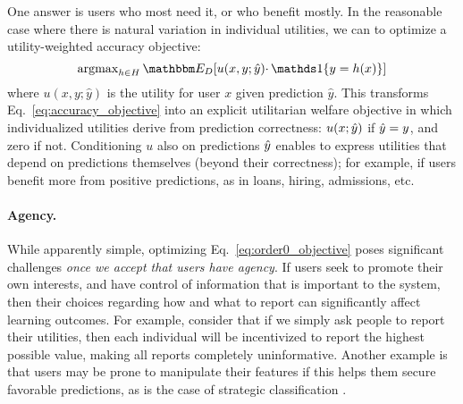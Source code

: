 One answer is users who most need it, or who benefit mostly.
In the reasonable case where there is natural variation in individual utilities,
we can to optimize a utility-weighted accuracy objective:
\begin{equation}
\label{eq:order0_objective}
\argmax\nolimits_{h \in H} \expect{\dist}{u(x,y; \hat{y}) \cdotp \one{y = h(x)}}
\end{equation}
where $u(x,y; \hat{y})$ is the utility for user $x$ given prediction $\hat{y}$.%
This transforms Eq.~\eqref{eq:accuracy_objective} into an explicit utilitarian welfare objective in which individualized utilities derive from prediction correctness:
$u(x;{\hat{y}})$ if ${\hat{y}}=y$, and zero if not.
Conditioning $u$ also on predictions ${\hat{y}}$ enables to express utilities that depend on predictions themselves (beyond their correctness);
for example, if users benefit more from positive predictions,
as in loans, hiring, admissions, etc.

\paragraph{Agency.}
While apparently simple, optimizing Eq.~\eqref{eq:order0_objective} poses significant challenges
\emph{once we accept that users have agency}.
If users seek to promote their own interests, and have control of information that is important to the system, then their choices regarding how and what to report can significantly affect learning outcomes.
For example, consider that if we simply ask people to report their utilities,
then each individual will be incentivized to report the highest possible value,
making all reports completely uninformative.
Another example is that users may be prone to manipulate their features if this helps them secure favorable predictions,
as is the case of strategic classification \citep{hardt2016strategic}.

